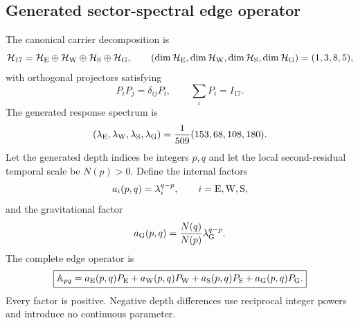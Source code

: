 \documentclass[11pt]{article}
\numberwithin{equation}{section}
\theoremstyle{remark}
\begin{document}
\subsection{Generated sector-spectral edge operator}
The canonical carrier decomposition is
\begin{equation}
\mathcal H_{17}=\mathcal H_{\rm E}\oplus\mathcal H_{\rm W}\oplus\mathcal H_{\rm S}\oplus\mathcal H_{\rm G},
\qquad
(\dim\mathcal H_{\rm E},\dim\mathcal H_{\rm W},\dim\mathcal H_{\rm S},\dim\mathcal H_{\rm G})=(1,3,8,5),
\end{equation}
with orthogonal projectors satisfying
\begin{equation}
P_iP_j=\delta_{ij}P_i,
\qquad
\sum_iP_i=I_{17}.
\label{eq:projectoralgebraedge}
\end{equation}
The generated response spectrum is
\begin{equation}
(\lambda_{\rm E},\lambda_{\rm W},\lambda_{\rm S},\lambda_{\rm G})
=\frac1{509}(153,68,108,180).
\label{eq:generatedresponsespectrum}
\end{equation}
Let the generated depth indices be integers $p,q$ and let the local second-residual temporal scale be $N(p)>0$.  Define the internal factors
\begin{equation}
a_i(p,q)=\lambda_i^{q-p},\qquad i={\rm E,W,S},
\label{eq:internaledgefactor}
\end{equation}
and the gravitational factor
\begin{equation}
a_{\rm G}(p,q)=\frac{N(q)}{N(p)}\lambda_{\rm G}^{q-p}.
\label{eq:gravityedgefactorfull}
\end{equation}
The complete edge operator is
\begin{equation}
\boxed{\mathbb A_{pq}=a_{\rm E}(p,q)P_{\rm E}+a_{\rm W}(p,q)P_{\rm W}+a_{\rm S}(p,q)P_{\rm S}+a_{\rm G}(p,q)P_{\rm G}.}
\label{eq:sectorcompression}
\end{equation}
Every factor is positive.  Negative depth differences use reciprocal integer powers and introduce no continuous parameter.
\end{document}
